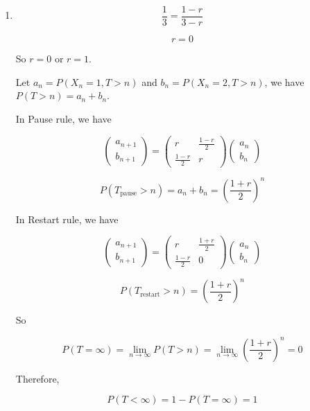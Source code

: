 \documentclass[11pt,a4paper]{article}
\newcommand{\Prob}{P}
\begin{document}
\begin{enumerate}
    $$
    p_1 = \frac{1-r}{3-r}
    $$

    \item[(c)]
    
    $$
    \frac{1}{3} = \frac{1-r}{3-r}
    $$

    $$
    r = 0
    $$
    
    So $r = 0$ or $r = 1$.

    Let $a_n = P(X_n = 1, T > n)$ and $b_n = P(X_n = 2, T > n)$, we have $P(T > n) = a_n + b_n$.

    In Pause rule, we have

    $$
    \begin{pmatrix} a_{n+1} \\ b_{n+1} \end{pmatrix}
    =
    \begin{pmatrix}
    r & \frac{1-r}{2} \\
    \frac{1-r}{2} & r
    \end{pmatrix}
    \begin{pmatrix} a_n \\ b_n \end{pmatrix}
    $$

    $$
    P(T_{\text{pause}} > n) = a_n + b_n = \left(\frac{1+r}{2}\right)^n
    $$

    In Restart rule, we have

    $$
    \begin{pmatrix} a_{n+1} \\ b_{n+1} \end{pmatrix}
    =
    \begin{pmatrix}
    r & \frac{1+r}{2} \\
    \frac{1-r}{2} & 0 
    \end{pmatrix}
    \begin{pmatrix} a_n \\ b_n \end{pmatrix}
    $$

    $$
    \Prob(T_{\text{restart}} > n) = \left(\frac{1+r}{2}\right)^n
    $$

    So

    $$
    P(T = \infty)
    = \lim_{n \to \infty} P(T > n)
    = \lim_{n \to \infty} \left(\frac{1+r}{2}\right)^n
    = 0
    $$

    Therefore,

    $$
    P(T < \infty) = 1 - P(T = \infty) = 1
    $$
\end{enumerate}

\clearpage
\end{document}
